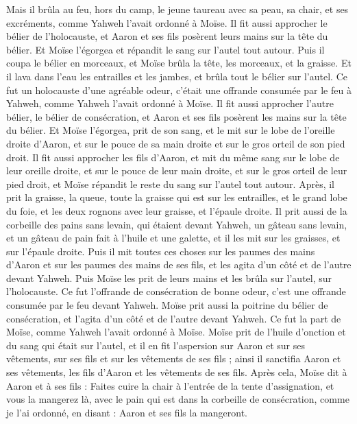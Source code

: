\begin{multicols}{2}
Mais il brûla au feu, hors du camp, le jeune taureau avec sa peau, sa chair, et ses excréments, comme Yahweh l'avait ordonné à Moïse.
Il fit aussi approcher le bélier de l'holocauste, et Aaron et ses fils posèrent leurs mains sur la tête du bélier.
Et Moïse l'égorgea et répandit le sang sur l'autel tout autour.
Puis il coupa le bélier en morceaux, et Moïse brûla la tête, les morceaux, et la graisse.
Et il lava dans l'eau les entrailles et les jambes, et brûla tout le bélier sur l'autel. Ce fut un holocauste d'une agréable odeur, c'était une offrande consumée par le feu à Yahweh, comme Yahweh l'avait ordonné à Moïse.
Il fit aussi approcher l'autre bélier, le bélier de consécration, et Aaron et ses fils posèrent les mains sur la tête du bélier.
Et Moïse l'égorgea, prit de son sang, et le mit sur le lobe de l'oreille droite d'Aaron, et sur le pouce de sa main droite et sur le gros orteil de son pied droit.
Il fit aussi approcher les fils d'Aaron, et mit du même sang sur le lobe de leur oreille droite, et sur le pouce de leur main droite, et sur le gros orteil de leur pied droit, et Moïse répandit le reste du sang sur l'autel tout autour.
Après, il prit la graisse, la queue, toute la graisse qui est sur les entrailles, et le grand lobe du foie, et les deux rognons avec leur graisse, et l'épaule droite.
Il prit aussi de la corbeille des pains sans levain, qui étaient devant Yahweh, un gâteau sans levain, et un gâteau de pain fait à l'huile et une galette, et il les mit sur les graisses, et sur l'épaule droite.
Puis il mit toutes ces choses sur les paumes des mains d'Aaron et sur les paumes des mains de ses fils, et les agita d'un côté et de l'autre devant Yahweh.
Puis Moïse les prit de leurs mains et les brûla sur l'autel, sur l'holocauste. Ce fut l'offrande de consécration de bonne odeur, c'est une offrande consumée par le feu devant Yahweh.
Moïse prit aussi la poitrine du bélier de consécration, et l'agita d'un côté et de l'autre devant Yahweh. Ce fut la part de Moïse, comme Yahweh l'avait ordonné à Moïse.
Moïse prit de l'huile d'onction et du sang qui était sur l'autel, et il en fit l'aspersion sur Aaron et sur ses vêtements, sur ses fils et sur les vêtements de ses fils ; ainsi il sanctifia Aaron et ses vêtements, les fils d'Aaron et les vêtements de ses fils.
Après cela, Moïse dit à Aaron et à ses fils : Faites cuire la chair à l'entrée de la tente d'assignation, et vous la mangerez là, avec le pain qui est dans la corbeille de consécration, comme je l'ai ordonné, en disant : Aaron et ses fils la mangeront.

\end{multicols}
